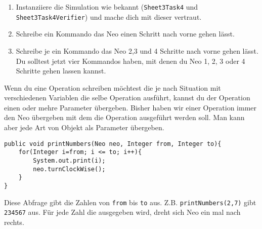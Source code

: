 
\begin{enumerate}
	\item 
	Instanziiere die Simulation wie bekannt (\lstinline{Sheet3Task4} und \lstinline{Sheet3Task4Verifier}) und mache dich mit dieser vertraut.
	\item 
		Schreibe ein Kommando das Neo einen Schritt nach vorne gehen lässt.
	\item 
		Schreibe je ein Kommando das Neo 2,3 und 4 Schritte nach vorne gehen lässt.
		Du solltest jetzt vier Kommandos haben, mit denen du Neo 1, 2, 3 oder 4 Schritte gehen lassen kannst.
\end{enumerate}

\begin{Infobox}
	Wenn du eine Operation schreiben möchtest die je nach Situation mit verschiedenen Variablen die selbe Operation ausführt, kannst du der Operation einen oder mehre Parameter übergeben. 
	Bisher haben wir einer Operation immer den Neo übergeben mit dem die Operation ausgeführt werden soll.
	Man kann aber jede Art von Objekt als Parameter übergeben.
	
	\begin{lstlisting}[xleftmargin=0.5cm]
public void printNumbers(Neo neo, Integer from, Integer to){
    for(Integer i=from; i <= to; i++){
		System.out.print(i);
		neo.turnClockWise();
    }
}
	\end{lstlisting}

	Diese Abfrage gibt die Zahlen von \lstinline{from} bis \lstinline{to} aus. 
	Z.B. \lstinline{printNumbers(2,7)} gibt \lstinline{234567} aus.
	Für jede Zahl die ausgegeben wird, dreht sich Neo ein mal nach rechts.
\end {Infobox}


